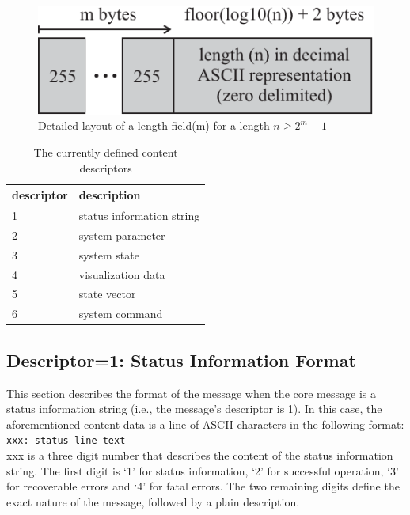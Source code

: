 \documentclass[letterpaper,oneside,12pt]{book}
\begin{document}
\begin{figure}[ht]
 \centerline{\includegraphics{figures/length_field}}
 \caption{Detailed layout of a length field(m) for a length $n \geq 2^m-1$}
 \label{fig:length_field}
\end{figure}

\begin{table}[ht]
 \centering
 \begin{tabular}{|l|l|}
  \hline
  \textbf{descriptor} & \textbf{description} \\
  \hline
  1 & status information string \\
  \hline
  2 & system parameter \\
  \hline
  3 & system state \\
  \hline
  4 & visualization data \\
  \hline
  5 & state vector \\
  \hline
  6 & system command \\
  \hline
 \end{tabular}
 \caption{The currently defined content descriptors}
\end{table}   


\subsection{Descriptor=1: Status Information Format}
\label{statusinfo_format}

This section describes the format of the message when the core message is 
a status information string (i.e., the message's descriptor is 1). In this 
case, the aforementioned content data is a line of ASCII characters 
in the following format:
\\[2ex]
\verb|xxx: status-line-text| 
\\[2ex]
xxx is a three digit number that describes the content of the status information string. 
The first digit is `1' for status information, `2' for successful operation, `3' 
for recoverable errors and `4' for fatal errors. The two remaining digits define 
the exact nature of the message, followed by a plain description.
\end{document}
